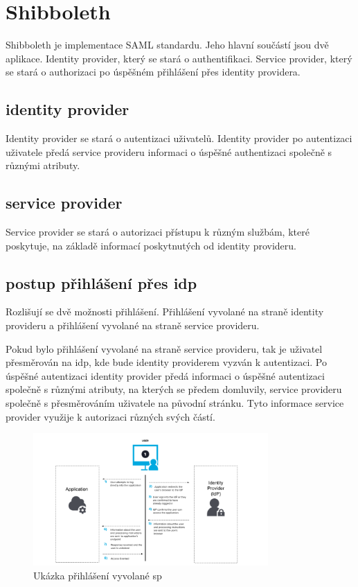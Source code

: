 \section{Shibboleth}

Shibboleth je implementace SAML standardu. Jeho hlavní součástí jsou dvě aplikace. Identity provider, který se stará o authentifikaci. Service provider, který se stará o authorizaci po úspěšném přihlášení přes identity providera. \cite{shibbolethWiki}

\subsection{identity provider}

Identity provider se stará o autentizaci uživatelů. Identity provider po autentizaci uživatele předá service provideru informaci o úspěšné authentizaci společně s různými atributy.

\subsection{service provider}

Service provider se stará o autorizaci přístupu k různým službám, které poskytuje, na základě informací poskytnutých od identity provideru.

\subsection{postup přihlášení přes idp}

Rozlišují se dvě možnosti přihlášení. Přihlášení vyvolané na straně identity provideru a přihlášení vyvolané na straně service provideru.

\linebreak
Pokud bylo přihlášení vyvolané na straně service provideru, tak je uživatel přesměrován na idp, kde bude identity providerem vyzván k autentizaci.
Po úspěšné autentizaci identity provider předá informaci o úspěšné autentizaci společně s různými atributy, na kterých se předem domluvily, service provideru společně s přesměrováním uživatele na původní stránku.
Tyto informace service provider využije k autorizaci různých svých částí.\cite{SAMLxOIDC}
\begin{figure}[bp]
	\centering
    \includegraphics[width=0.8\textwidth]{obrazky-figures/saml-sp.png}
	\caption{Ukázka přihlášení vyvolané sp\cite{SAMLxOIDC}}
	\label{saml-flow}
\end{figure}

